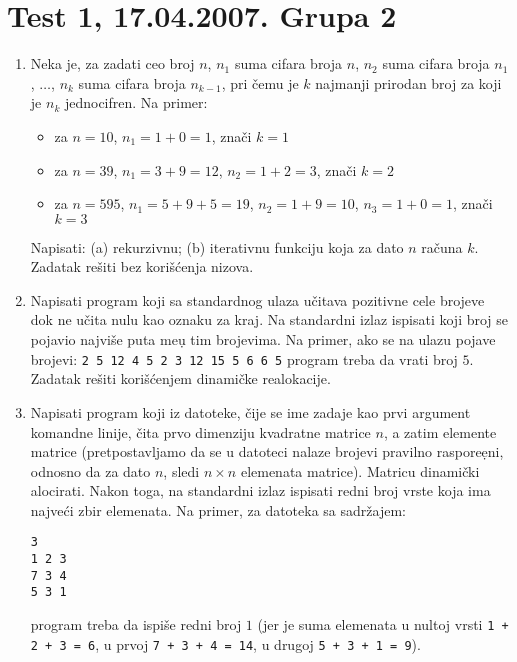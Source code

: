 \section{Test 1, 17.04.2007. Grupa 2}


\begin{enumerate}
\item
Neka je, za zadati ceo broj $n$, $n_1$ suma cifara broja $n$,
$n_2$ suma cifara broja $n_1$, $\ldots$, $n_k$ suma cifara broja
$n_{k-1}$, pri \v cemu je $k$ najmanji prirodan broj za koji je
$n_k$ jednocifren. Na primer:
\begin{itemize}
\item za $n=10$, $n_1 = 1+0 = 1$, zna\v ci $k=1$
\item za $n=39$, $n_1 = 3+9 = 12$, $n_2 = 1+2 = 3$, zna\v ci $k=2$
\item za $n=595$, $n_1 = 5+9+5 = 19$, $n_2 = 1+9 = 10$, $n_3 = 1+0 = 1$,
zna\v ci $k =3$
\end{itemize}
Napisati: (a) rekurzivnu; (b) iterativnu funkciju koja za dato
$n$ ra\v cuna $k$. Zadatak re\v siti bez kori\v s\' cenja nizova.

\item
Napisati program koji sa standardnog ulaza u\v citava pozitivne cele
brojeve dok ne u\v cita nulu kao oznaku za kraj. Na standardni izlaz
ispisati koji broj se pojavio najvi\v se puta me\d u tim brojevima.
Na primer, ako se na ulazu pojave brojevi:
\verb+2 5 12 4 5 2 3 12 15 5 6 6 5+
program treba da vrati broj $5$.
Zadatak re\v siti kori\v{s}\'cenjem dinami\v cke realokacije.

\item
Napisati program koji iz datoteke, \v cije se ime zadaje kao prvi
argument komandne linije, \v cita prvo dimenziju kvadratne matrice $n$,
a zatim elemente matrice (pretpostavljamo da se u datoteci nalaze brojevi
pravilno raspore\d eni,
odnosno da za dato $n$, sledi $n \times n$ elemenata matrice). Matricu
dinami\v cki alocirati.
Nakon toga, na standardni izlaz ispisati redni broj vrste koja ima
najve\' ci zbir elemenata.
Na primer, za datoteka sa sadr\v{z}ajem:
\vspace*{-8mm}
\begin{center}
\begin{verbatim}
3
1 2 3
7 3 4
5 3 1
\end{verbatim}
\end{center}
\vspace*{-2mm}
program treba da ispi\v se redni broj $1$ (jer je suma elemenata u nultoj
vrsti \verb|1 + 2 + 3 = 6|, u prvoj \verb|7 + 3 + 4 = 14|, u drugoj
\verb|5 + 3 + 1 = 9|).
\end{enumerate}



